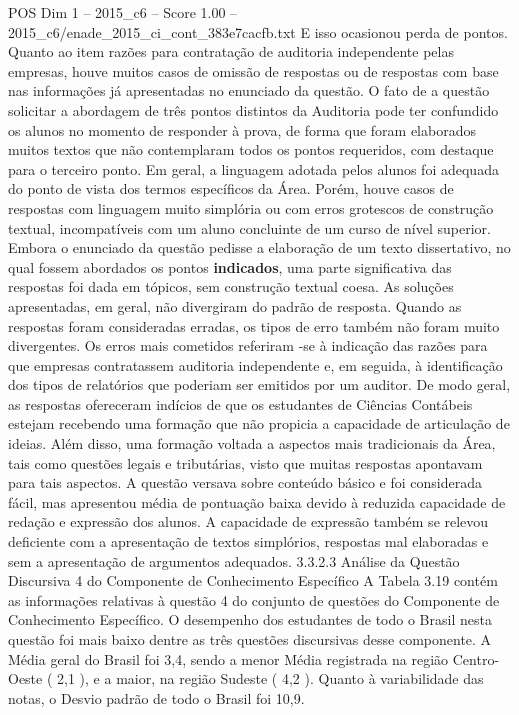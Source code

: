 \begin{textsample}{POS Dim 1 – 2015\_c6 – Score 1.00 – 2015\_c6/enade\_2015\_ci\_cont\_383e7cacfb.txt}
E isso ocasionou perda de pontos.
Quanto ao item razões para contratação de auditoria independente pelas empresas, houve muitos casos de omissão de respostas ou de respostas com base nas informações já apresentadas no enunciado da questão.
O fato de a questão solicitar a abordagem de três pontos distintos da Auditoria pode ter confundido os alunos no momento de responder à prova, de forma que foram elaborados muitos textos que não contemplaram todos os pontos requeridos, com destaque para o terceiro ponto.
Em geral, a linguagem adotada pelos alunos foi adequada do ponto de vista dos termos específicos da Área.
Porém, houve casos de respostas com linguagem muito simplória ou com erros grotescos de construção textual, incompatíveis com um aluno concluinte de um curso de nível superior.
Embora o enunciado da questão pedisse a elaboração de um texto dissertativo, no qual fossem abordados os pontos \textbf{indicados}, uma parte significativa das respostas foi dada em tópicos, sem construção textual coesa.
As soluções apresentadas, em geral, não divergiram do padrão de resposta.
Quando as respostas foram consideradas erradas, os tipos de erro também não foram muito divergentes.
Os erros mais cometidos referiram -se à indicação das razões para que empresas contratassem auditoria independente e, em seguida, à identificação dos tipos de relatórios que poderiam ser emitidos por um auditor.
De modo geral, as respostas ofereceram indícios de que os estudantes de Ciências Contábeis estejam recebendo uma formação que não propicia a capacidade de articulação de ideias.
Além disso, uma formação voltada a aspectos mais tradicionais da Área, tais como questões legais e tributárias, visto que muitas respostas apontavam para tais aspectos.
A questão versava sobre conteúdo básico e foi considerada fácil, mas apresentou média de pontuação baixa devido à reduzida capacidade de redação e expressão dos alunos.
A capacidade de expressão também se relevou deficiente com a apresentação de textos simplórios, respostas mal elaboradas e sem a apresentação de argumentos adequados. 3.3.2.3 Análise da Questão Discursiva 4 do Componente de Conhecimento Específico A Tabela 3.19 contém as informações relativas à questão 4 do conjunto de questões do Componente de Conhecimento Específico.
O desempenho dos estudantes de todo o Brasil nesta questão foi mais baixo dentre as três questões discursivas desse componente.
A Média geral do Brasil foi 3,4, sendo a menor Média registrada na região Centro-Oeste ( 2,1 ), e a maior, na região Sudeste ( 4,2 ).
Quanto à variabilidade das notas, o Desvio padrão de todo o Brasil foi 10,9.

\end{textsample}
